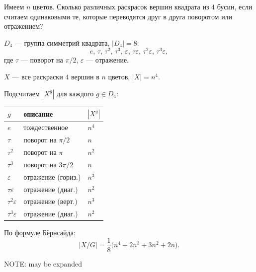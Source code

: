 \begin{example}
    Имеем $n$ цветов. Сколько различных раскрасок вершин квадрата из $4$ бусин, если считаем одинаковыми те,
    которые переводятся друг в друга поворотом или отражением?

    $D_4$ --- группа симметрий квадрата, $|D_4| = 8$:
    \[
        e,\, \tau,\, \tau^2,\, \tau^3,\, \varepsilon,\, \tau\varepsilon,\, \tau^2\varepsilon,\, \tau^3\varepsilon,
    \]
    где $\tau$ --- поворот на $\pi/2$, $\varepsilon$ --- отражение.

    $X$ --- все раскраски $4$ вершин в $n$ цветов, $|X| = n^4$.

    Подсчитаем $|X^g|$ для каждого $g \in D_4$:

    \begin{center}
    \begin{tabular}{l|l|l}
        $g$ & описание & $|X^g|$ \\
        \hline
        $e$ & тождественное & $n^4$ \\
        $\tau$ & поворот на $\pi/2$ & $n$ \\
        $\tau^2$ & поворот на $\pi$ & $n^2$ \\
        $\tau^3$ & поворот на $3\pi/2$ & $n$ \\
        $\varepsilon$ & отражение (гориз.) & $n^3$ \\
        $\tau\varepsilon$ & отражение (диаг.) & $n^2$ \\
        $\tau^2\varepsilon$ & отражение (верт.) & $n^3$ \\
        $\tau^3\varepsilon$ & отражение (диаг.) & $n^2$ \\
    \end{tabular}
    \end{center}

    По формуле Бёрнсайда:
    \[
        |X / G| = \frac{1}{8}\bigl(n^4 + 2n^3 + 3n^2 + 2n\bigr).
    \]


    NOTE: may be expanded
\end{example}
